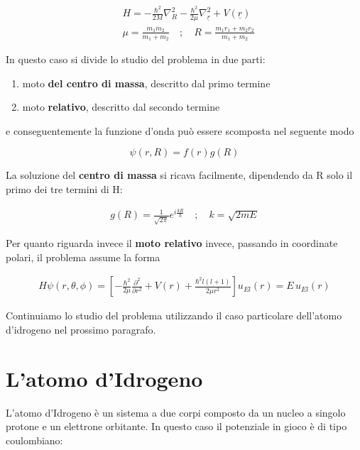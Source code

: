 	
	\begin{align}
	{}&H= -\frac{\hbar^2}{2 M}\nabla_R^2 -\frac{\hbar^2}{2 \mu}\nabla_{\underline r}^2 +  V(\underline{r}) \\
	&\mu = \frac{m_1 m_2}{m_1 + m_2} \quad ; \quad R= \frac{m_1 r_1 + m_2 r_2}{m_1 + m_2}
	\end{align}

In questo caso si divide lo studio del problema in due parti:

\begin{enumerate}
	\item moto  \textbf{del centro di massa}, descritto dal primo termine
	\item moto \textbf{relativo}, descritto dal secondo termine 
\end{enumerate}

e conseguentemente la funzione d'onda può essere scomposta nel seguente modo

\begin{equation}
\psi(r,R)= f(r)g(R)
\end{equation}

La soluzione del \textbf{centro di massa} si ricava facilmente, dipendendo da R solo il primo dei tre termini di H:

\begin{align}
g(R)= \frac{1}{\sqrt{2\pi}} e^{i\frac{kR}{\hbar}} \quad ; \quad k = \sqrt{2mE}
\end{align}

Per quanto riguarda invece il \textbf{moto relativo} invece, passando in coordinate polari, il problema assume la forma

\begin{align}
H \psi(r,\theta,\phi)= \left[
-\frac{\hbar^2}{2 \mu}\frac{\partial^2}{\partial r^2} + V(r) +  \frac{\hbar^2 l(l+1)}{2 \mu r^2} \right] u_{E l}(r) = E \, u_{E l}(r)
\end{align}

Continuiamo lo studio del problema utilizzando il caso particolare dell'atomo d'idrogeno nel prossimo paragrafo.

\newpage

\section{L'atomo d'Idrogeno}

L'atomo d'Idrogeno è un sistema a due corpi composto da un nucleo a singolo protone e un elettrone orbitante. In questo caso il potenziale in gioco è di tipo coulombiano:

